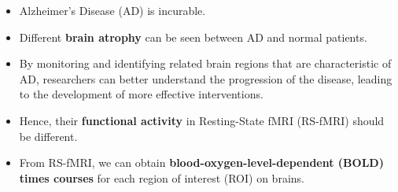     \begin{itemize}
        \item \small Alzheimer's Disease (AD) is incurable.

        \item \small  Different \textbf{brain atrophy} can be seen between AD and normal patients.

        \item \small  By monitoring and identifying related brain regions that are characteristic of AD, researchers can better understand the progression of the disease, leading to the development of more effective interventions.
        
        \item \small  Hence, their \textbf{functional activity} in Resting-State fMRI (RS-fMRI) should be different. 

        \item \small From RS-fMRI, we can obtain \textbf{blood-oxygen-level-dependent (BOLD) times courses} for each region of interest (ROI) on brains.

    \end{itemize}
